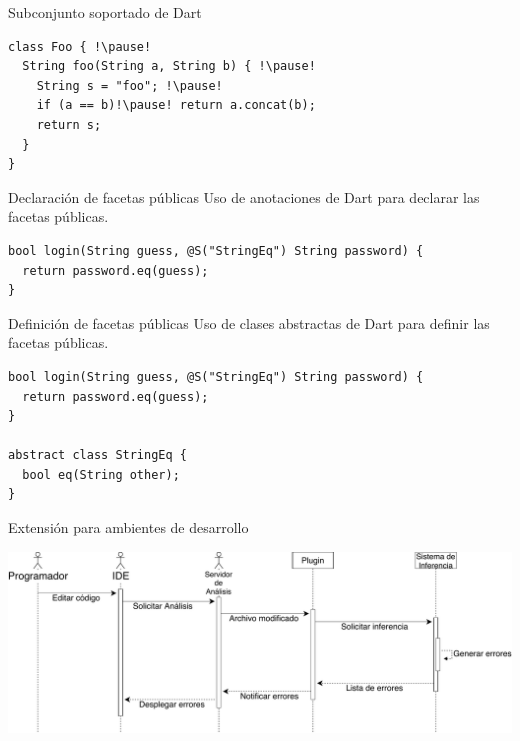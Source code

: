 \documentclass[aspectratio=169,18pt]{beamer}
\begin{document}
\begin{frame}[fragile]{Subconjunto soportado de Dart}
	\begin{center}
	\begin{lstlisting}[escapechar=!,basicstyle=\fontsize{10}{10}\ttfamily]
class Foo { !\pause!
  String foo(String a, String b) { !\pause!
    String s = "foo"; !\pause!
    if (a == b)!\pause! return a.concat(b);
    return s;
  }
}
  \end{lstlisting}
	\end{center}
\end{frame}

\begin{frame}[fragile]{Declaración de facetas públicas}
	Uso de anotaciones de Dart para declarar las facetas públicas. \\ \pause
	\vspace{1cm}
\begin{lstlisting}[escapechar=?,basicstyle=\fontsize{10}{10}\ttfamily]
bool login(String guess, @S("StringEq") String password) {
  return password.eq(guess);
}
\end{lstlisting}
\end{frame}

\begin{frame}[fragile]{Definición de facetas públicas}
	Uso de clases abstractas de Dart para definir las facetas públicas. \\ \pause
	\vspace{1cm}
\begin{lstlisting}[escapechar=?,basicstyle=\fontsize{10}{10}\ttfamily]
bool login(String guess, @S("StringEq") String password) {
  return password.eq(guess);
}

abstract class StringEq {
  bool eq(String other);
}
\end{lstlisting}
\end{frame}

\begin{frame}[fragile]{Extensión para ambientes de desarrollo}
	\begin{center}
		\includegraphics[width=1.05\textwidth]{images/sequence.pdf}
	\end{center}
\end{frame}
\end{document}
